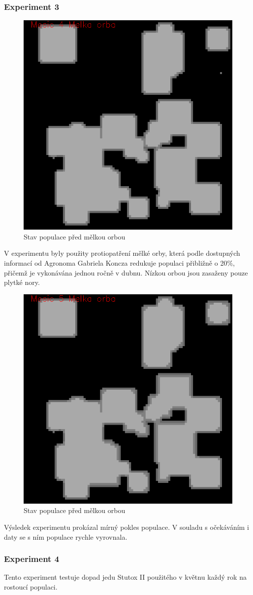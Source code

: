 \documentclass[a4paper,11pt]{article}
\begin{document}
\subsubsection{Experiment 3}
\begin{figure}[h]
\begin{center}
    \includegraphics[width=.4\linewidth]{melka_orba4.png}
    \caption{Stav populace před mělkou orbou}
    \label{exp3_obr1}
\end{center}
\end{figure}
V experimentu byly použity protiopatření mělké orby, která podle dostupných informací od Agronoma Gabriela Koncza redukuje populaci přibližně o 20\%, přičemž je vykonávána jednou ročně v dubnu. Nízkou orbou jsou zasaženy pouze plytké nory.

\begin{figure}[h]
\begin{center}
    \includegraphics[width=.4\linewidth]{melka_orba5.png}
    \caption{Stav populace před mělkou orbou}
    \label{exp3_obr2}
\end{center}
\end{figure}

Výsledek experimentu prokázal mírný pokles populace. V souladu s očekáváním i daty se s ním populace rychle vyrovnala.

\newpage
\subsubsection{Experiment 4}
Tento experiment testuje dopad jedu Stutox II použitého v květnu každý rok na rostoucí populaci.
\end{document}
